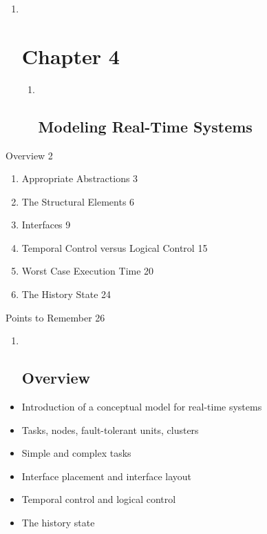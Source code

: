 \begin{enumerate}
\item ~
  \section{Chapter 4}\label{chapter-4}

  \begin{enumerate}
  \item ~
    \subsection{Modeling Real-Time
    Systems}\label{modeling-real-time-systems}
  \end{enumerate}
\end{enumerate}

Overview 2

\begin{enumerate}
\def\labelenumi{\arabic{enumi}.}
\item
  Appropriate Abstractions 3
\item
  The Structural Elements 6
\item
  Interfaces 9
\item
  Temporal Control versus Logical Control 15
\item
  Worst Case Execution Time 20
\item
  The History State 24
\end{enumerate}

Points to Remember 26

\begin{enumerate}
\item ~
  \subsection{}\label{section}

  \subsection{Overview}\label{overview}
\end{enumerate}

\begin{itemize}
\item
  Introduction of a conceptual model for real-time systems
\item
  Tasks, nodes, fault-tolerant units, clusters
\item
  Simple and complex tasks
\item
  Interface placement and interface layout
\item
  Temporal control and logical control
\item
  The history state
\end{itemize}

